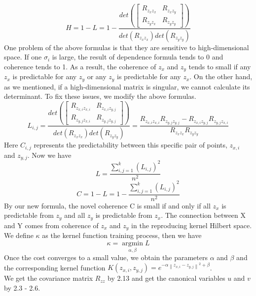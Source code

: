 \documentclass[12pt]{report} %
\newcommand{\norm}[1]{\left\lVert #1 \right\rVert}
\begin{document}
\begin{equation}
H=1-L=1-\frac{det(\begin{bmatrix}
	R_{z_{x}z_{x}} & R_{z_{x}z_{y}} \\
	R_{z_{y}z_{x}} & R_{z_{y}z_{y}}
	\end{bmatrix})}
{det(R_{z_{x}z_{x}})det(R_{z_{y}z_{y}})}
\end{equation}
One problem of the above formulas is that they are sensitive to high-dimensional space. If one \(\sigma_i\) is large, the result of dependence formula tends to 0 and coherence tends to 1. As a result, the coherence of $z_x$ and $z_y$ tends to small if any $z_x$ is predictable for any $z_y$ or any $z_y$ is predictable for any $z_x$. On the other hand, as we mentioned, if a high-dimensional matrix is singular, we cannot calculate its determinant. To fix these issues, we modify the above formulas.
\begin{equation}
L_{i,j}=\frac{det(\begin{bmatrix}
	R_{z_{x,i}z_{x,i}} & R_{z_{x,i}z_{y,j}} \\
	R_{z_{y,j}z_{x,i}} & R_{z_{y,j}z_{y,j}}
	\end{bmatrix})}
{det(R_{z_{x}z_{x}})det(R_{z_{y}z_{y}})}=
\frac{R_{z_{x,i}z_{x,i}}R_{z_{y,j}z_{y,j}}-R_{z_{x,i}z_{y,j}}R_{z_{y,j}z_{x,i}}}
{R_{z_{x}z_{x}}R_{z_{y}z_{y}}}
\end{equation}
Here \(C_{i,j}\) represents the predictability between this specific pair of points, $z_{x,i}$ and $z_{y,j}$. Now we have
\begin{equation}
L=\frac{\sum_{i,j=1}^{k}(L_{i,j})^2}{n^2}
\end{equation}
\begin{equation}
C=1-L=1-\frac{\sum_{i,j=1}^{k}(L_{i,j})^2}{n^2}
\end{equation}
By our new formula, the novel coherence C is small if and only if all $z_x$ is predictable from $z_y$ and all $z_y$ is predictable from $z_x$. The connection between X and Y comes from coherence of $z_x$ and $z_y$ in the reproducing kernel Hilbert space. We define $\kappa$ as the kernel function training process, then we have
\begin{equation}
\kappa=\operatorname*{argmin}_{\alpha,\beta} L
\end{equation}
Once the cost converges to a small value, we obtain the parameters $\alpha$ and $\beta$ and the corresponding kernel function $K(z_{x,i},z_{y,j})=e^{-\alpha \norm{z_{x,i}-z_{y,j}}^2 + \beta}$.\\
We get the covariance matrix $R_{zz}$ by 2.13 and get the canonical variables $u$ and $v$ by 2.3 - 2.6.
\end{document}
